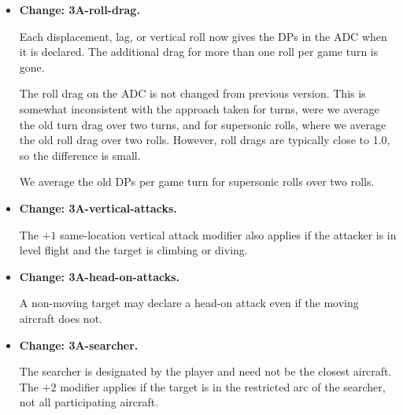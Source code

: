 \documentclass[10pt]{report}
\newcommand{\itemtag}[1]{\item \textbf{Change: #1.}\par}
\begin{document}
\begin{itemize}
    \itemtag{3A-roll-drag} Each displacement, lag, or vertical roll now gives the DPs in the ADC when it is declared. The additional drag for more than one roll per game turn is gone.
    
    The roll drag on the ADC is not changed from previous version. This is somewhat inconsistent with the approach taken for turns, were we average the old turn drag over two turns, and for supersonic rolls, where we average the old roll drag over two rolls. However, roll drags are typically close to 1.0, so the difference is small.
    
    We average the old DPs per game turn for supersonic rolls over two rolls.

    \itemtag{3A-vertical-attacks} The $+1$ same-location vertical attack modifier also applies if the attacker is in level flight and the target is climbing or diving.

    \itemtag{3A-head-on-attacks} A non-moving target may declare a head-on attack even if the moving aircraft does not.
    
    \itemtag{3A-searcher} The searcher is designated by the player and need not be the closest aircraft. The $+2$ modifier applies if the target is in the restricted arc of the searcher, not all participating aircraft.
 
       
    
    

    
    
    

\end{itemize}
\end{document}
